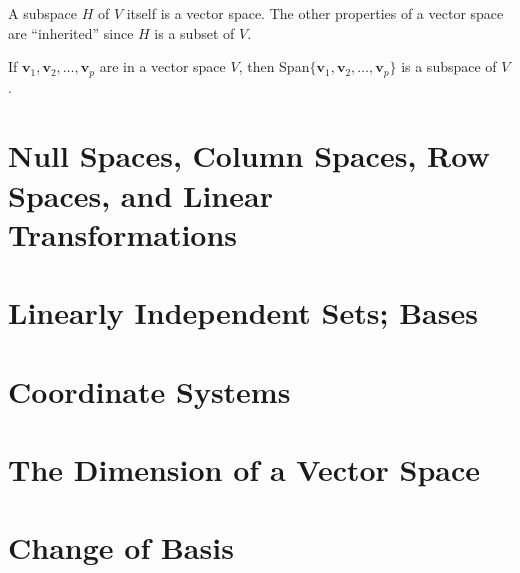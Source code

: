 \documentclass[../linalg.tex]{subfiles}
\begin{document}
A subspace $H$ of $V$ itself is a vector space. The other properties of a vector space are ``inherited'' since $H$ is a subset of $V$.

\begin{theorem}
    If $\textbf{v}_1,\textbf{v}_2,\dots,\textbf{v}_p$ are in a vector space $V$, then Span$\{\textbf{v}_1,\textbf{v}_2,\dots,\textbf{v}_p\}$ is a subspace of $V$.
\end{theorem}

\section{Null Spaces, Column Spaces, Row Spaces, and Linear Transformations}
\section{Linearly Independent Sets; Bases}
\section{Coordinate Systems}
\section{The Dimension of a Vector Space}
\section{Change of Basis}
\end{document}
